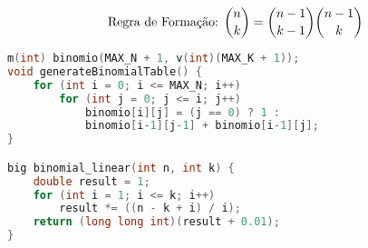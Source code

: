 \begin{displaymath}
	\text{Regra de Formação: }
	\binom{n}{k}=\binom{n-1}{k-1}\binom{n-1}{k}\\\\
\end{displaymath}

\begin{lstlisting}[language=C++]
m(int) binomio(MAX_N + 1, v(int)(MAX_K + 1));
void generateBinomialTable() {
    for (int i = 0; i <= MAX_N; i++)
		for (int j = 0; j <= i; j++)
			binomio[i][j] = (j == 0) ? 1 :
            binomio[i-1][j-1] + binomio[i-1][j];
}

big binomial_linear(int n, int k) {
    double result = 1;
    for (int i = 1; i <= k; i++)
        result *= ((n - k + i) / i);
    return (long long int)(result + 0.01);
}
\end{lstlisting}